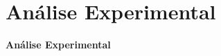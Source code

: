 \documentclass[compress, hide notes]{beamer}
\let\olditem=\item%
\renewcommand{\item}{\olditem \justifying}%
\begin{document}

	\section{Análise Experimental}
	\begin{frame}{}
		\centering
		\Huge \color{blue} \textbf{Análise Experimental}
	\end{frame}
	
\end{document}
